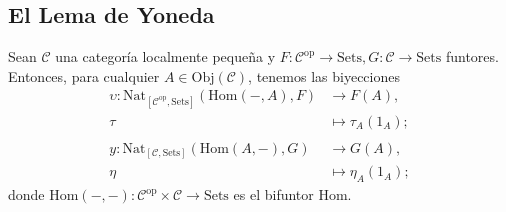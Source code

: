 \documentclass[tesis]{subfiles}
\begin{document}
\subsection*{El Lema de Yoneda} \label{Ssec: Lema de Yoneda}

\begin{Teo} \label{Teo: Lema de Yoneda}
    Sean $\mathscr{C}$ una categoría localmente pequeña y $F:\mathscr{C}^\text{op}\to \text{Sets}, G:\mathscr{C}\to \text{Sets}$ funtores. Entonces, para cualquier $A\in\text{Obj}(\mathscr{C})$, tenemos las biyecciones
    \begin{align*}
        \upsilon:\text{Nat}_{[\mathscr{C}^\text{op},\text{Sets}]}(\text{Hom}(-,A),F) &\rightarrow F(A), \\
        \tau&\mapsto \tau_A(1_A); \\ \\
        y:\text{Nat}_{[\mathscr{C},\text{Sets}]}(\text{Hom}(A,-),G) &\rightarrow G(A), \\
        \eta&\mapsto \eta_A(1_A);
    \end{align*}
    donde $\text{Hom}(-,-):\mathscr{C}^\text{op}\times\mathscr{C}\to \text{Sets}$ es el bifuntor Hom.
\end{Teo}
\end{document}
